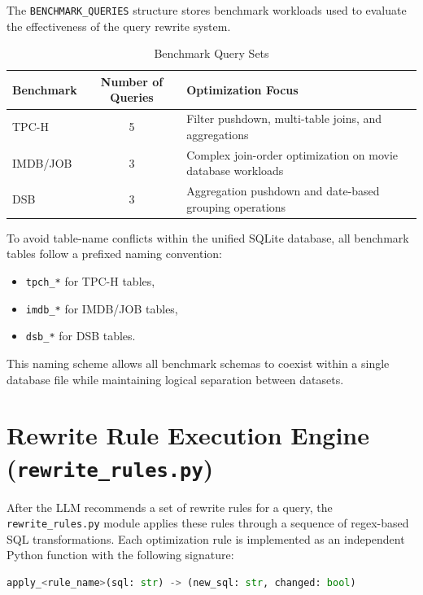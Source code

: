 \documentclass[12pt,a4paper]{article}
\begin{document}
The \texttt{BENCHMARK\_QUERIES} structure stores benchmark workloads used to evaluate the effectiveness of the query rewrite system.

\begin{table}[h]
\centering
\caption{Benchmark Query Sets}
\label{tab:benchmark_queries}
\begin{tabular}{|l|c|p{7cm}|}
\hline
\textbf{Benchmark} & \textbf{Number of Queries} & \textbf{Optimization Focus} \\
\hline
TPC-H & 5 & Filter pushdown, multi-table joins, and aggregations \\
\hline
IMDB/JOB & 3 & Complex join-order optimization on movie database workloads \\
\hline
DSB & 3 & Aggregation pushdown and date-based grouping operations \\
\hline
\end{tabular}
\end{table}

To avoid table-name conflicts within the unified SQLite database, all benchmark tables follow a prefixed naming convention:

\begin{itemize}
    \item \texttt{tpch\_*} for TPC-H tables,
    \item \texttt{imdb\_*} for IMDB/JOB tables,
    \item \texttt{dsb\_*} for DSB tables.
\end{itemize}

This naming scheme allows all benchmark schemas to coexist within a single database file while maintaining logical separation between datasets.



\section{Rewrite Rule Execution Engine (\texttt{rewrite\_rules.py})}

After the LLM recommends a set of rewrite rules for a query, the \texttt{rewrite\_rules.py} module applies these rules through a sequence of regex-based SQL transformations. Each optimization rule is implemented as an independent Python function with the following signature:

\begin{lstlisting}[language=Python,basicstyle=\ttfamily\small]
apply_<rule_name>(sql: str) -> (new_sql: str, changed: bool)
\end{lstlisting}
\end{document}
